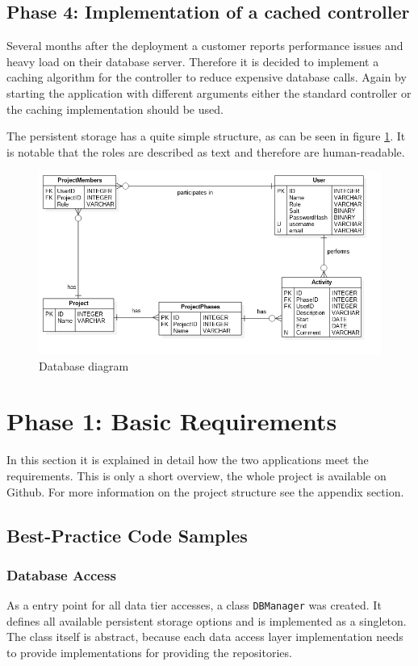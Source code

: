 \subsection{Phase 4: Implementation of a cached controller}
Several months after the deployment a customer reports performance issues and heavy load on their database server. Therefore it is decided to implement a caching algorithm for the controller to reduce expensive database calls. Again by starting the application with different arguments either the standard controller or the caching implementation should be used.


The persistent storage has a quite simple structure, as can be seen in figure \ref{fig:database}. It is notable that the roles are described as text and therefore are human-readable. 
\begin{figure}[htbp]
\includegraphics[width=\textwidth]{./content/pictures/database.png}
\caption{Database diagram}
\label{fig:database}
\end{figure}

\clearpage

\section{Phase 1: Basic Requirements}
\label{sec:code-samples}
In this section it is explained in detail how the two applications meet the requirements. This is only a short overview, the whole project is available on Github. For more information on the project structure see the appendix section.

\subsection{Best-Practice Code Samples}

\subsubsection{Database Access}
As a entry point for all data tier accesses, a class \texttt{DBManager} was created. It defines all available persistent storage options and is implemented as a singleton. The class itself is abstract, because each data access layer implementation needs to provide implementations for providing the repositories.



